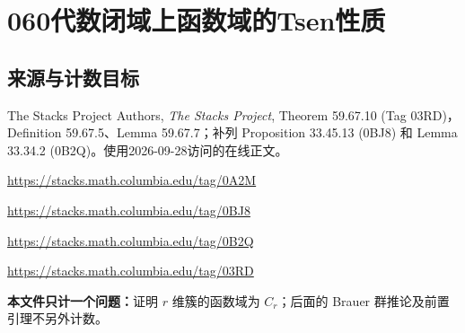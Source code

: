 \documentclass[UTF8,11pt]{ctexart}
\theoremstyle{definition}
\begin{document}
\section*{060\quad 代数闭域上函数域的Tsen性质}
\subsection*{来源与计数目标}
The Stacks Project Authors, \emph{The Stacks Project}, Theorem 59.67.10 (Tag 03RD)，Definition 59.67.5、Lemma 59.67.7；补列 Proposition 33.45.13 (0BJ8) 和 Lemma 33.34.2 (0B2Q)。使用2026-09-28访问的在线正文。\par\url{https://stacks.math.columbia.edu/tag/0A2M}\par\url{https://stacks.math.columbia.edu/tag/0BJ8}\par\url{https://stacks.math.columbia.edu/tag/0B2Q}
\par\url{https://stacks.math.columbia.edu/tag/03RD}
\par\textbf{本文件只计一个问题：}证明 $r$ 维簇的函数域为 $C_r$；后面的 Brauer 群推论及前置引理不另外计数。
\end{document}
